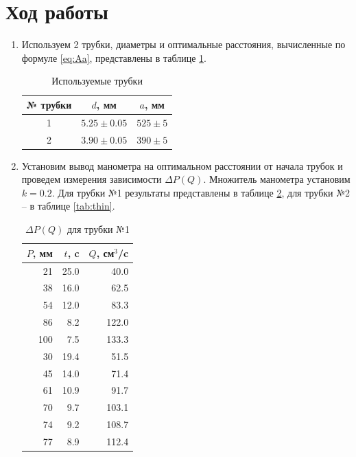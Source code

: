 \documentclass[12pt]{article}
\begin{document}
\section{Ход работы}
\begin{enumerate}
    \item Используем 2 трубки, диаметры и оптимальные расстояния, вычисленные по формуле \ref{eq:Aa},
    представлены в таблице \ref{tab:trub}.
    \begin{table}[h!]
        \centering
        \begin{tabular}{|c|c|c|}
        \toprule
        № трубки & $d$, мм & $a$, мм\\
        \midrule
        1    & $5.25 \pm 0.05$ & $525 \pm 5$\\
        2    & $3.90 \pm 0.05$ & $390 \pm 5$\\
        \bottomrule
        \end{tabular}
        \caption{Используемые трубки}
        \label{tab:trub}
    \end{table}

    \item Установим вывод манометра на оптимальном расстоянии от начала трубок и проведем
    измерения зависимости $\Delta P(Q)$. Множитель манометра установим $k = 0.2$. Для трубки
    №1 результаты представлены в таблице \ref{tab:wide}, для трубки №2 -- в таблице \ref{tab:thin}.
    \begin{table}[h!]
        \centering
        \begin{tabular}{|r|r|r|}
        \toprule
          $P$, мм &    $t$, c &     $Q$, см$^3$/c \\
        \midrule
         21 & 25.0 &  40.0 \\
         38 & 16.0 &  62.5 \\
         54 & 12.0 &  83.3 \\
         86 &  8.2 & 122.0 \\
        100 &  7.5 & 133.3 \\
         30 & 19.4 &  51.5 \\
         45 & 14.0 &  71.4 \\
         61 & 10.9 &  91.7 \\
         70 &  9.7 & 103.1 \\
         74 &  9.2 & 108.7 \\
         77 &  8.9 & 112.4 \\
        \bottomrule
        \end{tabular}
        \caption{$\Delta P(Q)$ для трубки №1}
        \label{tab:wide}
        \end{table}


\end{enumerate}
\end{document}

